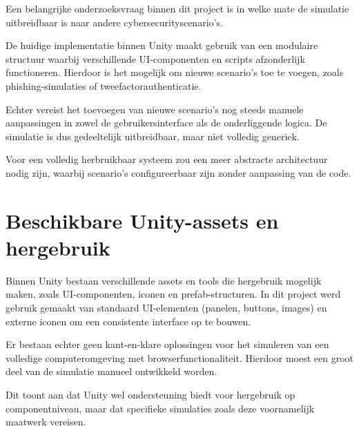Een belangrijke onderzoeksvraag binnen dit project is in welke mate de simulatie uitbreidbaar is naar andere cybersecurityscenario's.

De huidige implementatie binnen Unity maakt gebruik van een modulaire structuur waarbij verschillende UI-componenten en scripts afzonderlijk functioneren. Hierdoor is het mogelijk om nieuwe scenario’s toe te voegen, zoals phishing-simulaties of tweefactorauthenticatie.

Echter vereist het toevoegen van nieuwe scenario’s nog steeds manuele aanpassingen in zowel de gebruikersinterface als de onderliggende logica. De simulatie is dus gedeeltelijk uitbreidbaar, maar niet volledig generiek.

Voor een volledig herbruikbaar systeem zou een meer abstracte architectuur nodig zijn, waarbij scenario’s configureerbaar zijn zonder aanpassing van de code.

\section{Beschikbare Unity-assets en hergebruik}

Binnen Unity bestaan verschillende assets en tools die hergebruik mogelijk maken, zoals UI-componenten, iconen en prefab-structuren. In dit project werd gebruik gemaakt van standaard UI-elementen (panelen, buttons, images) en externe iconen om een consistente interface op te bouwen.

Er bestaan echter geen kant-en-klare oplossingen voor het simuleren van een volledige computeromgeving met browserfunctionaliteit. Hierdoor moest een groot deel van de simulatie manueel ontwikkeld worden.

Dit toont aan dat Unity wel ondersteuning biedt voor hergebruik op componentniveau, maar dat specifieke simulaties zoals deze voornamelijk maatwerk vereisen.